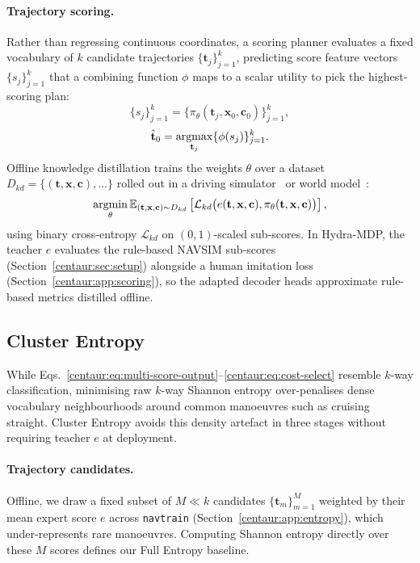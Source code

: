 \paragraph{Trajectory scoring.} Rather than regressing continuous coordinates, a scoring planner evaluates a fixed vocabulary of $k$ candidate trajectories $\{\mathbf{t}_j\}_{j=1}^k$, predicting score feature vectors $\{s_j\}_{j=1}^k$ that a combining function $\phi$ maps to a scalar utility to pick the highest-scoring plan:
\begin{equation}
  \label{centaur:eq:multi-score-output}
  \{s_j\}_{j=1}^k = \{ \pi_\theta(\mathbf{t}_j, \mathbf{x}_0, \mathbf{c}_0) \}_{j=1}^k,
\end{equation}
\begin{equation}
  \label{centaur:eq:cost-select}
  \hat{\mathbf{t}}_0 = \mathop{\mathrm{argmax}}\limits_{\mathbf{t}_j} \{\phi(s_j)\}_{j=1}^k.
\end{equation}
Offline knowledge distillation trains the weights $\theta$ over a dataset $D_{kd} = \{(\mathbf{t}, \mathbf{x}, \mathbf{c}), \dots\}$ rolled out in a driving simulator~\cite{caesar2021nuplan,dosovitskiy2017carla} or world model~\cite{yang2024genad,gao2024vista}:
\begin{equation}
  \label{centaur:eq:objective-score}
  \mathop{\mathrm{argmin}}\limits_{\theta} \mathbb{E}_{(\mathbf{t},\mathbf{x},\mathbf{c})\sim D_{kd}} \left[\mathcal{L}_{kd}\big(e(\mathbf{t},\mathbf{x},\mathbf{c}), \pi_\theta(\mathbf{t},\mathbf{x},\mathbf{c})\big)\right],
\end{equation}
using binary cross-entropy $\mathcal{L}_{kd}$ on $(0,1)$-scaled sub-scores. In Hydra-MDP, the teacher $e$ evaluates the rule-based NAVSIM sub-scores (Section~\ref{centaur:sec:setup}) alongside a human imitation loss (Section~\ref{centaur:app:scoring}), so the adapted decoder heads approximate rule-based metrics distilled offline.

\subsection{Cluster Entropy}\label{centaur:sec:ce}

While Eqs.~\eqref{centaur:eq:multi-score-output}--\eqref{centaur:eq:cost-select} resemble $k$-way classification, minimising raw $k$-way Shannon entropy over-penalises dense vocabulary neighbourhoods around common manoeuvres such as cruising straight. Cluster Entropy avoids this density artefact in three stages without requiring teacher $e$ at deployment.

\paragraph{Trajectory candidates.} Offline, we draw a fixed subset of $M \ll k$ candidates $\{\mathbf{t}_m\}_{m=1}^M$ weighted by their mean expert score $e$ across \texttt{navtrain} (Section~\ref{centaur:app:entropy}), which under-represents rare manoeuvres. Computing Shannon entropy directly over these $M$ scores defines our Full Entropy baseline.

